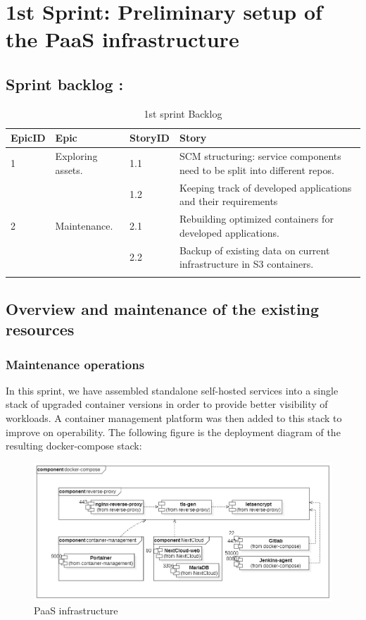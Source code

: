 \graphicspath{{./assets/}}
\setcounter{mtc}{2}
\chapter{1st Sprint: Preliminary setup of the PaaS infrastructure  }
\minitoc
\newpage

\section{Sprint backlog :}

\begin{longtable}[H]{|m{1.5cm}|m{3cm}|m{1.5cm}|m{8cm}|}
\hline
{\textbf{EpicID}} & {\textbf{Epic}} & {\textbf{StoryID}} & {\textbf{Story}} \\
\hline
1 &  \raggedright Exploring assets.	& 1.1  & SCM structuring: service components need to be split into different repos. \\
\cline{3-4}
& & 1.2 &  	Keeping track of developed applications and their requirements \\
\hline
2  & Maintenance. &	2.1	 &  Rebuilding optimized containers for developed applications. \\
\cline{3-4}
& & 2.2 & Backup of existing data on current infrastructure in S3 containers.\\
\hline
\caption{1st sprint Backlog}
\end{longtable}

\section{Overview and maintenance of the existing resources}
\subsection{Maintenance operations}

In this sprint, we have assembled standalone self-hosted services into a single stack of upgraded container versions in order to provide better visibility of workloads. A container management platform was then added to this stack to improve on operability. 
The following figure is the deployment diagram of the resulting docker-compose stack:

 \begin{figure}[H] 
\includegraphics[width=1.0\textwidth,angle=00]{assets/f9.jpg}
\caption{PaaS infrastructure}
\label{fig:f9}
\end{figure}

